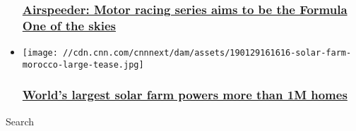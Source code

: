 \begin{itemize}
  \hypertarget{airspeeder-motor-racing-series-aims-to-be-the-formula-one-of-the-skies}{%
  \subsubsection{\texorpdfstring{\href{/2019/06/26/sport/airspeeder-drone-racing-alauna-supercharged-spt-intl/index.html}{Airspeeder:
  Motor racing series aims to be the Formula One of the
  skies}}{Airspeeder: Motor racing series aims to be the Formula One of the skies}}\label{airspeeder-motor-racing-series-aims-to-be-the-formula-one-of-the-skies}}
\item
  \href{/2019/02/06/motorsport/morocco-solar-farm-formula-e-spt-intl/index.html}{}

  \texttt{[image: //cdn.cnn.com/cnnnext/dam/assets/190129161616-solar-farm-morocco-large-tease.jpg]}

  \hypertarget{worlds-largest-solar-farm-powers-more-than-1m-homes}{%
  \subsubsection{\texorpdfstring{\href{/2019/02/06/motorsport/morocco-solar-farm-formula-e-spt-intl/index.html}{World's
  largest solar farm powers more than 1M
  homes}}{World's largest solar farm powers more than 1M homes}}\label{worlds-largest-solar-farm-powers-more-than-1m-homes}}
\end{itemize}

Search

